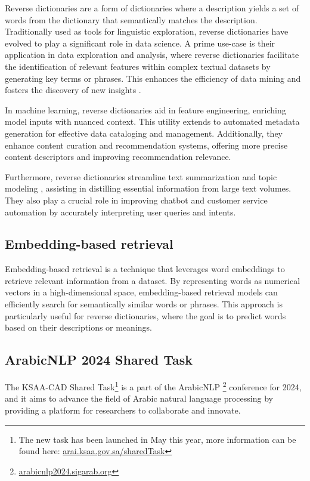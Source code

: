 \documentclass[12.5pt]{article}
\begin{document}
Reverse dictionaries are a form of dictionaries where a description yields a set of words from the dictionary that semantically matches the description. Traditionally used as tools for linguistic exploration, reverse dictionaries have evolved to play a significant role in data science. A prime use-case is their application in data exploration and analysis, where reverse dictionaries facilitate the identification of relevant features within complex textual datasets by generating key terms or phrases. This enhances the efficiency of data mining and fosters the discovery of new insights \cite{Chen2022}.

In machine learning, reverse dictionaries aid in feature engineering, enriching model inputs with nuanced context. This utility extends to automated metadata generation for effective data cataloging and management. Additionally, they enhance content curation and recommendation systems, offering more precise content descriptors and improving recommendation relevance.

Furthermore, reverse dictionaries streamline text summarization and topic modeling \cite{Griffiths2004}, assisting in distilling essential information from large text volumes. They also play a crucial role in improving chatbot and customer service automation by accurately interpreting user queries and intents.

\subsection{Embedding-based retrieval}

Embedding-based retrieval is a technique that leverages word embeddings to retrieve relevant information from a dataset. By representing words as numerical vectors in a high-dimensional space, embedding-based retrieval models can efficiently search for semantically similar words or phrases. This approach is particularly useful for reverse dictionaries, where the goal is to predict words based on their descriptions or meanings.

\subsection{ArabicNLP 2024 Shared Task}\label{sec:arabicnlp}

The KSAA-CAD Shared Task\footnote{The new task has been launched in May this year, more information can be found here: \href{https://arai.ksaa.gov.sa/sharedTask2024/}{arai.ksaa.gov.sa/sharedTask}} is a part of the ArabicNLP \footnote{\href{https://arabicnlp2024.sigarab.org/}{arabicnlp2024.sigarab.org}} conference for 2024, and it aims to advance the field of Arabic natural language processing by providing a platform for researchers to collaborate and innovate. 
\end{document}
